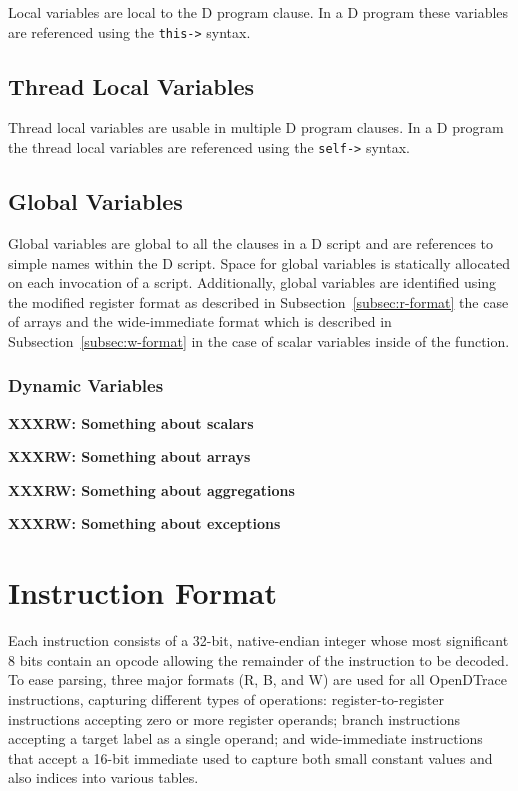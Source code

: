 Local variables are local to the D program clause.  In a D program
these variables are referenced using the \verb|this->| syntax.  

\subsection{Thread Local Variables}
\label{sec:thread-local-vars}

Thread local variables are usable in multiple D program clauses.  In a
D program the thread local variables are referenced using the
\verb|self->| syntax.

\subsection{Global Variables}
\label{sec:globals-vars}

Global variables are global to all the clauses in a D script and are references
to simple names within the D script.  Space for global variables is statically
allocated on each invocation of a script. Additionally, global variables are
identified using the modified register format as described in
Subsection~\ref{subsec:r-format} the case of arrays and the wide-immediate
format which is described in Subsection~\ref{subsec:w-format} in the case
of scalar variables inside of the  function.

\subsubsection{Dynamic Variables}
\label{sec:sec:dynamic-vars}


\textbf{XXXRW: Something about scalars}

\textbf{XXXRW: Something about arrays}

\textbf{XXXRW: Something about aggregations}

\textbf{XXXRW: Something about exceptions}

\section{Instruction Format}

Each instruction consists of a 32-bit, native-endian integer whose most
significant 8 bits contain an opcode allowing the remainder of the instruction
to be decoded.
To ease parsing, three major formats (R, B, and W) are used for all OpenDTrace
instructions, capturing different types of operations: register-to-register
instructions accepting zero or more register operands; branch instructions
accepting a target label as a single operand; and wide-immediate instructions
that accept a 16-bit immediate used to capture both small constant values and
also indices into various tables.

